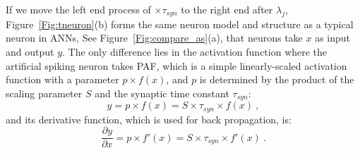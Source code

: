 \documentclass{article}
\begin{document}
	If we move the left end process of $\times \tau_{syn}$ to the right end after $\lambda_j$, Figure~\ref{Fig:tneuron}(b) forms the same neuron model and structure as a typical neuron in ANNs, See Figure~\ref{Fig:compare_as}(a), that neurons take $x$ as input and output $y$.
	The only difference lies in the activation function where the artificial spiking neuron takes PAF, which is a simple linearly-scaled activation function with a parameter $p\times f(x)$, and $p$ is determined by the product of the scaling parameter $S$ and the synaptic time constant $\tau_{syn}$:
	\begin{equation}
	y = p \times f(x) = S \times \tau_{syn} \times f(x)~,
	\label{equ:PAF}
	\end{equation}
	and its derivative function, which is used for back propagation, is:
	\begin{equation}
	\frac{\partial y}{\partial x} = p \times f'(x) = S \times \tau_{syn} \times f'(x)~.
	\end{equation}
	
\end{document}
